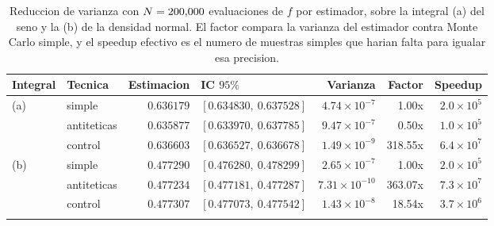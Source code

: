 \begin{table}[htbp]\centering
\caption{Reduccion de varianza con $N=200{,}000$ evaluaciones de $f$ por estimador, sobre la integral (a) del seno y la (b) de la densidad normal. El factor compara la varianza del estimador contra Monte Carlo simple, y el speedup efectivo es el numero de muestras simples que harian falta para igualar esa precision.}
\label{tab:varianza}
\footnotesize
\begin{tabular}{l|l|r|l|r|r|r}
\toprule
Integral & Tecnica & Estimacion & IC $95\%$ & Varianza & Factor & Speedup \\
\midrule
(a) & simple & $0.636179$ & $[0.634830,\ 0.637528]$ & $4.74\times 10^{-7}$ & 1.00x & $2.0\times 10^{5}$ \\
 & antiteticas & $0.635877$ & $[0.633970,\ 0.637785]$ & $9.47\times 10^{-7}$ & 0.50x & $1.0\times 10^{5}$ \\
 & control & $0.636603$ & $[0.636527,\ 0.636678]$ & $1.49\times 10^{-9}$ & 318.55x & $6.4\times 10^{7}$ \\
\addlinespace
(b) & simple & $0.477290$ & $[0.476280,\ 0.478299]$ & $2.65\times 10^{-7}$ & 1.00x & $2.0\times 10^{5}$ \\
 & antiteticas & $0.477234$ & $[0.477181,\ 0.477287]$ & $7.31\times 10^{-10}$ & 363.07x & $7.3\times 10^{7}$ \\
 & control & $0.477307$ & $[0.477073,\ 0.477542]$ & $1.43\times 10^{-8}$ & 18.54x & $3.7\times 10^{6}$ \\
\addlinespace
\bottomrule
\end{tabular}
\end{table}
